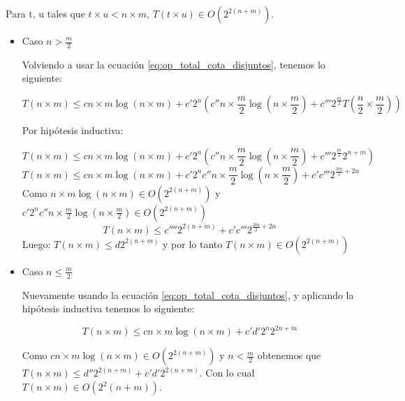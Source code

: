 \documentclass[a4paper, 12pt] {article}
\begin{document}
Para t, u tales que $ t \times u < n \times m $, $ T(t \times u) \in O\left( 2^{2\left( n + m\right) }\right) $.
\begin{itemize}
 \item Caso $n > \frac{m}{2} $

Volviendo a usar la ecuaci\'on \ref{eq:op_total_cota_disjuntos}, tenemos lo siguiente: 

\begin{equation}
T\left( n \times m \right) \leq c n\times m \log \left(n\times m \right) + c' 2^{n}\left( c'' n\times \frac{m}{2} \log \left( n \times \frac{m}{2} \right) + c''' 2^{\frac{m}{2}}T\left( \frac{n}{2} \times \frac{m}{2} \right) \right)
\end{equation}



Por hip\'otesis inductiva:


\begin{equation}
T\left( n \times m \right) \leq c n\times m \log \left(n\times m \right) + c' 2^{n}\left( c'' n\times \frac{m}{2} \log \left( n \times \frac{m}{2} \right) + c''' 2^{\frac{m}{2}} 2^{n+m} \right)
\end{equation}
\begin{equation}
T\left( n \times m \right) \leq c n\times m \log \left(n\times m \right) +  c' 2^{n}c'' n\times \frac{m}{2} \log \left( n \times \frac{m}{2} \right) + c'c''' 2^{\frac{3m}{2} + 2n}  
\end{equation}
Como $n\times m \log \left(n\times m \right) \in O\left(2^{2\left(n+m\right)}\right)$ y $ c' 2^{n}c'' n\times \frac{m}{2} \log \left( n \times \frac{m}{2} \right) \in O\left(2^{2\left(n+m\right)}\right)$
\begin{equation}
T\left( n \times m \right) \leq c'''' 2^{2\left(n+m\right)}+ c'c''' 2^{\frac{3m}{2} + 2n}  
\end{equation}
Luego:
$T\left( n \times m \right) \leq d 2^{2\left(n+m\right)}$ y por lo tanto $T\left( n\times m \right) \in O\left( 2^{2\left(n+m\right)}\right)$



\item Caso $n \leq \frac{m}{2}$

Nuevamente usando la ecuaci\'on \ref{eq:op_total_cota_disjuntos}, y aplicando la hip\'otesis inductiva tenemos lo siguiente: 

\begin{equation}
T\left( n \times m \right) \leq c n\times m \log \left(n\times m \right) + c'd' 2^{n}2^{2n+m}
\end{equation}


Como $ c n\times m \log \left(n\times m \right) \in O\left( 2^{2\left( n+m\right)}\right)$ y $ n < \frac{m}{2} $ obtenemos que $ T\left( n \times m \right) \leq d''2^{ 2\left( n+m \right)} + c'd' 2^{2\left(n+m \right)}$. Con lo cual $ T\left(n \times m \right) \in O\left(2^2\left( n+m\right) \right)$.


\end{itemize}
\end{document}
